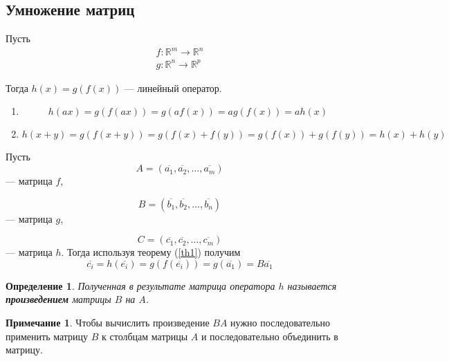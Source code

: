 \documentclass[]{article}
\theoremstyle{theorem}
\newtheorem{dfn}{Определение}
\theoremstyle{definition}
\newtheorem*{nt}{Примечание}
\begin{document}
\subsection{Умножение матриц}
Пусть \begin{gather*}
	f:\mathbb{R}^m\rightarrow\mathbb{R}^n
	\\
	g:\mathbb{R}^n\rightarrow\mathbb{R}^p
\end{gather*}

Тогда $h(x)=g(f(x))$ --- линейный оператор.

\begin{enumerate}
	\item
	\begin{equation*}
		h(ax)=g(f(ax))=g(af(x))=ag(f(x))=ah(x)
	\end{equation*}
	\item
\begin{equation*}
	h(x+y)=g(f(x+y))=g(f(x)+f(y))=g(f(x))+g(f(y))=h(x)+h(y)
\end{equation*}
\end{enumerate}


Пусть 
\begin{equation*}
	A=(\overline{a_1},\overline{a_2},\ldots,\overline{a_m})
\end{equation*} --- матрица $f$, 

\begin{equation*}
	B=(\overline{b_1},\overline{b_2},\ldots,\overline{b_n})
\end{equation*} --- матрица $g$, 

\begin{equation*}
	C=(\overline{c_1},\overline{c_2},\ldots,\overline{c_m})
\end{equation*} --- матрица $h$. Тогда используя теорему (\ref{th1}) получим
\begin{equation*}
	\overline{c_i}=h(\overline{e_i})=g(f(\overline{e_i}))=g(\overline{a_1})=B\overline{a_1}
\end{equation*}

\begin{dfn}
	Полученная в результате матрица оператора $h$ называется \textbf{произведением} матрицы $B$ на $A$.
\end{dfn}

\begin{nt}
	Чтобы вычислить произведение $BA$ нужно последовательно применить матрицу $B$ к столбцам матрицы $A$ и последовательно объединить в матрицу.
\end{nt}
\end{document}
